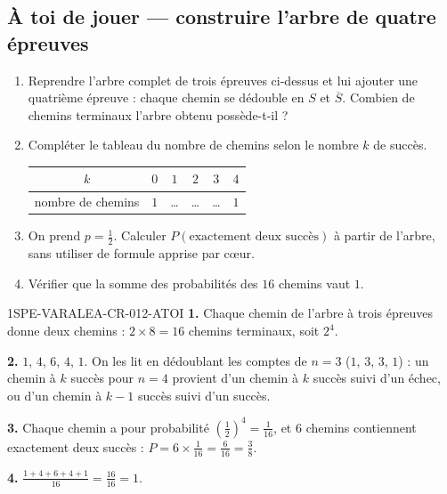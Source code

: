 
\subsection*{À toi de jouer — construire l'arbre de quatre épreuves}

\begin{enumerate}
  \item Reprendre l'arbre complet de trois épreuves ci-dessus et lui ajouter
        une quatrième épreuve : chaque chemin se dédouble en $S$ et
        $\overline S$. Combien de chemins terminaux l'arbre obtenu
        possède-t-il ?
  \item Compléter le tableau du nombre de chemins selon le nombre $k$ de
        succès.

        \begin{center}
        \begin{tabular}{c|ccccc}
          $k$ & $0$ & $1$ & $2$ & $3$ & $4$\\ \hline
          nombre de chemins & $1$ & \ldots & \ldots & \ldots & $1$
        \end{tabular}
        \end{center}

  \item On prend $p=\tfrac12$. Calculer $P(\text{exactement deux succès})$ à
        partir de l'arbre, sans utiliser de formule apprise par cœur.
  \item Vérifier que la somme des probabilités des $16$ chemins vaut $1$.
\end{enumerate}

\ifnxVersionProfesseur
\begin{corrige}{1SPE-VARALEA-CR-012-ATOI}
\textbf{1.} Chaque chemin de l'arbre à trois épreuves donne deux chemins :
$2\times 8 = 16$ chemins terminaux, soit $2^4$.

\textbf{2.} $1$, $4$, $6$, $4$, $1$. On les lit en dédoublant les comptes de
$n=3$ ($1$, $3$, $3$, $1$) : un chemin à $k$ succès pour $n=4$ provient d'un
chemin à $k$ succès suivi d'un échec, ou d'un chemin à $k-1$ succès suivi d'un
succès.

\textbf{3.} Chaque chemin a pour probabilité $\left(\tfrac12\right)^4 =
\tfrac1{16}$, et $6$ chemins contiennent exactement deux succès :
$P = 6\times\tfrac1{16} = \tfrac{6}{16} = \tfrac38$.

\textbf{4.} $\tfrac{1+4+6+4+1}{16} = \tfrac{16}{16} = 1$.
\end{corrige}
\fi

